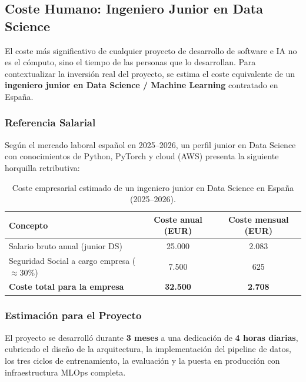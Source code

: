 \subsection{Coste Humano: Ingeniero Junior en Data Science}

El coste más significativo de cualquier proyecto de desarrollo de software e IA no es el cómputo, sino el tiempo de las personas que lo desarrollan. Para contextualizar la inversión real del proyecto, se estima el coste equivalente de un \textbf{ingeniero junior en Data Science / Machine Learning} contratado en España.

\subsubsection{Referencia Salarial}

Según el mercado laboral español en 2025--2026, un perfil junior en Data Science con conocimientos de Python, PyTorch y cloud (AWS) presenta la siguiente horquilla retributiva:

\begin{table}[H]
\centering
\begin{tabularx}{\textwidth}{|X|c|c|}
\hline
\textbf{Concepto} & \textbf{Coste anual (EUR)} & \textbf{Coste mensual (EUR)} \\ \hline
Salario bruto anual (junior DS) & 25.000 & 2.083 \\ \hline
Seguridad Social a cargo empresa ($\approx$30\%) & 7.500 & 625 \\ \hline
\textbf{Coste total para la empresa} & \textbf{32.500} & \textbf{2.708} \\ \hline
\end{tabularx}
\caption{Coste empresarial estimado de un ingeniero junior en Data Science en España (2025--2026).}
\label{tab:coste_humano}
\end{table}

\subsubsection{Estimación para el Proyecto}

El proyecto se desarrolló durante \textbf{3 meses} a una dedicación de \textbf{4 horas diarias}, cubriendo el diseño de la arquitectura, la implementación del pipeline de datos, los tres ciclos de entrenamiento, la evaluación y la puesta en producción con infraestructura MLOps completa.

